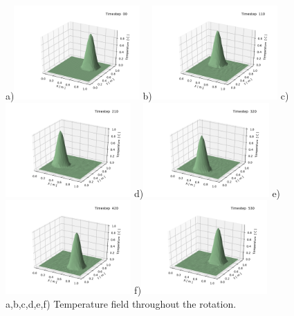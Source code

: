 \begin{center}
a)\includegraphics[width=4.8cm]{python_codes/fieldstone_43/results/experiment1/crni/solution_0000.pdf}
b)\includegraphics[width=4.8cm]{python_codes/fieldstone_43/results/experiment1/crni/solution_0110.pdf}
c)\includegraphics[width=4.8cm]{python_codes/fieldstone_43/results/experiment1/crni/solution_0210.pdf}
d)\includegraphics[width=4.8cm]{python_codes/fieldstone_43/results/experiment1/crni/solution_0320.pdf}
e)\includegraphics[width=4.8cm]{python_codes/fieldstone_43/results/experiment1/crni/solution_0420.pdf}
f)\includegraphics[width=4.8cm]{python_codes/fieldstone_43/results/experiment1/crni/solution_0530.pdf}\\
{\captionfont a,b,c,d,e,f) Temperature field throughout the rotation.} 
\end{center}

